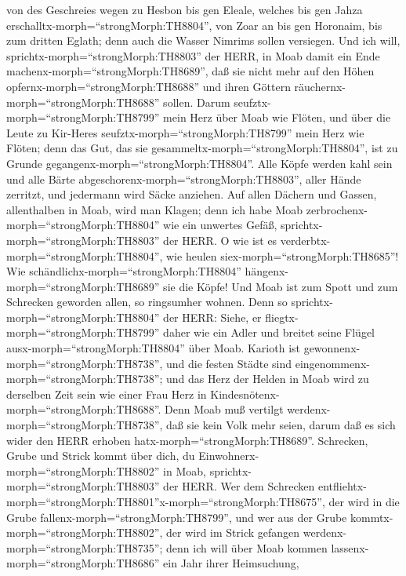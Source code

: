 von des Geschreies wegen zu Hesbon bis gen Eleale, welches bis gen Jahza
erschalltx-morph=``strongMorph:TH8804'', von Zoar an bis gen Horonaim,
bis zum dritten Eglath; denn auch die Wasser Nimrims sollen versiegen.
 Und ich will, sprichtx-morph=``strongMorph:TH8803'' der
HERR, in Moab damit ein Ende machenx-morph=``strongMorph:TH8689'', daß
sie nicht mehr auf den Höhen opfernx-morph=``strongMorph:TH8688'' und
ihren Göttern räuchernx-morph=``strongMorph:TH8688'' sollen.
 Darum seufztx-morph=``strongMorph:TH8799'' mein Herz über
Moab wie Flöten, und über die Leute zu Kir-Heres
seufztx-morph=``strongMorph:TH8799'' mein Herz wie Flöten; denn das Gut,
das sie gesammeltx-morph=``strongMorph:TH8804'', ist zu Grunde
gegangenx-morph=``strongMorph:TH8804''.  Alle Köpfe werden
kahl sein und alle Bärte abgeschorenx-morph=``strongMorph:TH8803'',
aller Hände zerritzt, und jedermann wird Säcke anziehen. 
Auf allen Dächern und Gassen, allenthalben in Moab, wird man Klagen;
denn ich habe Moab zerbrochenx-morph=``strongMorph:TH8804'' wie ein
unwertes Gefäß, sprichtx-morph=``strongMorph:TH8803'' der HERR.
 O wie ist es verderbtx-morph=``strongMorph:TH8804'', wie
heulen siex-morph=``strongMorph:TH8685''! Wie
schändlichx-morph=``strongMorph:TH8804''
hängenx-morph=``strongMorph:TH8689'' sie die Köpfe! Und Moab ist zum
Spott und zum Schrecken geworden allen, so ringsumher wohnen.
 Denn so sprichtx-morph=``strongMorph:TH8804'' der HERR:
Siehe, er fliegtx-morph=``strongMorph:TH8799'' daher wie ein Adler und
breitet seine Flügel ausx-morph=``strongMorph:TH8804'' über Moab.
 Karioth ist gewonnenx-morph=``strongMorph:TH8738'', und
die festen Städte sind eingenommenx-morph=``strongMorph:TH8738''; und
das Herz der Helden in Moab wird zu derselben Zeit sein wie einer Frau
Herz in Kindesnötenx-morph=``strongMorph:TH8688''.  Denn
Moab muß vertilgt werdenx-morph=``strongMorph:TH8738'', daß sie kein
Volk mehr seien, darum daß es sich wider den HERR erhoben
hatx-morph=``strongMorph:TH8689''.  Schrecken, Grube und
Strick kommt über dich, du Einwohnerx-morph=``strongMorph:TH8802'' in
Moab, sprichtx-morph=``strongMorph:TH8803'' der HERR.  Wer
dem Schrecken
entfliehtx-morph=``strongMorph:TH8801''\textbar x-morph=``strongMorph:TH8675'',
der wird in die Grube fallenx-morph=``strongMorph:TH8799'', und wer aus
der Grube kommtx-morph=``strongMorph:TH8802'', der wird im Strick
gefangen werdenx-morph=``strongMorph:TH8735''; denn ich will über Moab
kommen lassenx-morph=``strongMorph:TH8686'' ein Jahr ihrer Heimsuchung,

